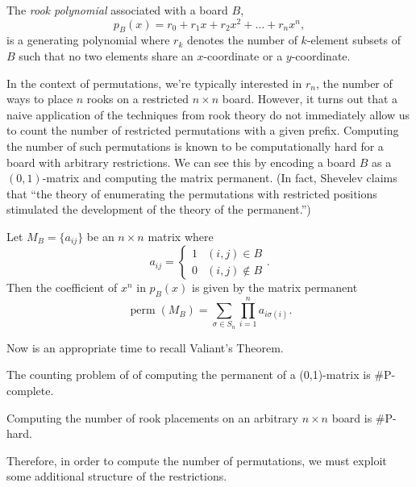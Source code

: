 \begin{definition}
  The \textit{rook polynomial} associated with a board $B$,
  \[
    p_B(x) = r_0 + r_1 x + r_2 x^2 + \dots + r_n x^n,
  \]
  is a generating polynomial where $r_k$ denotes the number of $k$-element subsets
  of $B$ such that no two elements share an $x$-coordinate or a $y$-coordinate.
\end{definition}

In the context of permutations, we're typically interested in $r_n$, the number
of ways to place $n$ rooks on a restricted $n \times n$ board.
However, it turns out that a naive application of the techniques from
rook theory do not immediately allow us to count the number of
restricted permutations with a given prefix.
Computing the number of such permutations is known to be computationally hard
for a board with arbitrary restrictions.
We can see this by encoding a board $B$ as a $(0,1)$-matrix and computing the matrix
permanent. (In fact, Shevelev \cite{Shevelev1992} claims that
``the theory of enumerating the permutations with restricted positions
stimulated the development of the theory of the permanent.'')

\begin{lemma}
  Let $M_B = \{a_{ij}\}$ be an $n \times n$ matrix where \[
    a_{ij} = \begin{cases}
      1 & (i,j) \in B \\
      0 & (i,j) \not\in B
    \end{cases}.
  \]
  Then the coefficient of $x^n$ in $p_B(x)$ is given by the matrix permanent
  \[
    \operatorname{perm}(M_B) = \sum_{\sigma \in S_n} \prod_{i=1}^n a_{i\sigma(i)}.
  \]
\end{lemma}

Now is an appropriate time to recall Valiant's Theorem.

\begin{theorem}
  The counting problem of of computing the permanent of a (0,1)-matrix is \#P-complete.
\end{theorem}

\begin{corollary}
  Computing the number of rook placements on an arbitrary $n \times n$ board is
  \#P-hard.
\end{corollary}

Therefore, in order to compute the number of permutations, we must exploit some
additional structure of the restrictions.

